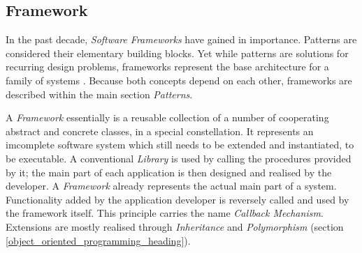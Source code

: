 %
%
%
%
%
%
%

\subsection{Framework}
\label{framework_heading}

In the past decade, \emph{Software Frameworks} have gained in importance.
Patterns are considered their elementary building blocks. Yet while patterns
are solutions for recurring design problems, frameworks represent the base
architecture for a family of systems \cite{pree}. Because both concepts depend
on each other, frameworks are described within the main section \emph{Patterns}.

A \emph{Framework} essentially is a reusable collection of a number of
cooperating abstract and concrete classes, in a special constellation. It
represents an imcomplete software system which still needs to be extended and
instantiated, to be executable. A conventional \emph{Library} is used by
calling the procedures provided by it; the main part of each application is
then designed and realised by the developer. A \emph{Framework} already
represents the actual main part of a system. Functionality added by the
application developer is reversely called and used by the framework itself.
This principle carries the name \emph{Callback Mechanism}. Extensions are
mostly realised through \emph{Inheritance} and \emph{Polymorphism} (section
\ref{object_oriented_programming_heading}).

